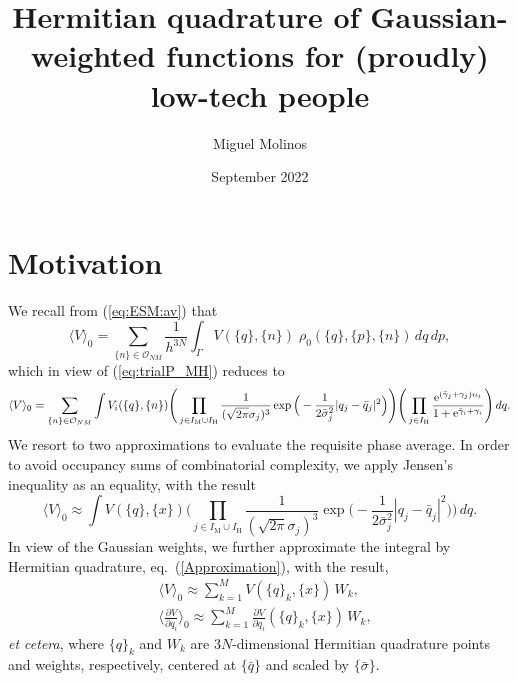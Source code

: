 \documentclass{article}
\title{Hermitian quadrature of Gaussian-weighted functions for (proudly) low-tech people}
\author{Miguel Molinos}
\date{September 2022}
\begin{document}
\maketitle

\tableofcontents

\section{Motivation}
\label{sec:Motivation}

We recall from (\ref{eq:ESM:av}) that
\begin{equation}
    \langle V \rangle_0
    =
    \sum_{\{{n}\}\in\mathcal{O}_{NM}} \frac{1}{h^{3N}}
    \int_{\Gamma}
    V(\{{q}\}, \{{n}\})
    \;
    \rho_0(\{{q}\}, \{{p}\}, \{{n}\})
    \, dq \, dp ,
\end{equation}
which in view of (\ref{eq:trialP_MH}) reduces to
\begin{equation}
\label{eq:mean-field-potential-jensen}
    \langle V \rangle_0
    =
    \sum_{\{{n}\}\in\mathcal{O}_{NM}}
    \int
        V_i(\{{q}\}, \{{n}\})
        \Bigg(
            \prod_{j\in{I_\text{M} \cup I_\text{H}}}
            \frac{1}{(\sqrt{2\pi}\sigma_j)^3}
            \exp
            \Big(
                -
                \frac{1}{2\bar{\sigma}_j^2}|{q}_j - \bar{{q}}_j|^2
            \Big)
        \Bigg)
        \Bigg(
            \prod_{j\in I_\text{H}}
            \frac
            {
                {\rm e}^{(\bar{\gamma}_{j}+\gamma_j) n_i}
            }
            {
                1 + {\rm e}^{\bar{\gamma}_{i}+\gamma_i}
            }
        \Bigg)
    \, dq .
\end{equation}
We resort to two approximations to evaluate the requisite phase average. In order to avoid occupancy sums of combinatorial complexity, we apply Jensen's inequality as an equality, with the result
\begin{equation}
    \langle V \rangle_0
    \approx
    \int
        V(\{{q}\}, \{{x}\})
        \Bigg(
            \prod_{j\in{I_\text{M} \cup I_\text{H}}}
            \frac{1}{(\sqrt{2\pi}\sigma_j)^3}
            \exp
            \Big(
                -
                \frac{1}{2\bar{\sigma}_j^2}|{q}_j - \bar{{q}}_j|^2
            \Big)
        \Bigg)
    \, dq .
\end{equation}
In view of the Gaussian weights, we further approximate the integral by Hermitian quadrature, eq.~(\ref{Approximation}), with the result,
\begin{subequations}
\begin{align}
    &
    \langle V \rangle_0
    \approx
    \sum_{k=1}^M V(\{{q}\}_k, \{{x}\}) \, W_k ,
    \\ &
    \langle \frac{\partial V}{\partial q_i} \rangle_0
    \approx
    \sum_{k=1}^M \frac{\partial V}{\partial q_i} (\{{q}\}_k, \{{x}\}) \, W_k ,
\end{align}
\end{subequations}
{\sl et cetera}, where $\{{q}\}_k$ and $W_k$ are $3N$-dimensional Hermitian quadrature points and weights, respectively, centered at $\{\bar{q}\}$ and scaled by $\{\bar{\sigma}\}$.
\end{document}
